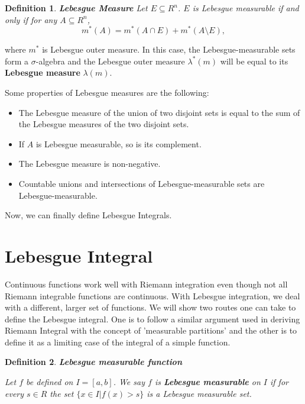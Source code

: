 \documentclass[12pt]{amsart}
\newtheorem{definition}{Definition}
\theoremstyle{plain}
\theoremstyle{definition}
\theoremstyle{remark}
\numberwithin{equation}{section}
\numberwithin{thm}{section}
\begin{document}
\begin{definition} 
\textbf{Lebesgue Measure}
    Let $E \subseteq R^n$. $E$ is Lebesgue measurable if and only if for any $A \subseteq R^n$,
    \begin{equation*}
        m^*(A) = m^*(A \cap E) + m^*(A \setminus E),
    \end{equation*}
\end{definition}
 where $m^*$ is Lebesgue outer measure. In this case, the Lebesgue-measurable sets form a $\sigma$-algebra and the Lebesgue outer measure $\lambda^*(m)$ will be equal to its \textbf{Lebesgue measure} $\lambda(m)$. 

Some properties of Lebesgue measures are the following:

\begin{itemize}
    \item The Lebesgue measure of the union of two disjoint sets is equal to the sum of the Lebesgue measures of the two disjoint sets.
    \item If $A$ is Lebesgue measurable, so is its complement.
    \item The Lebesgue measure is non-negative.
    \item Countable unions and intersections of Lebesgue-measurable sets are Lebesgue-measurable.
\end{itemize}


Now, we can finally define Lebesgue Integrals.

\section{\textbf{Lebesgue Integral}}\label{sec:LebesgueIntegral}
Continuous functions work well with Riemann integration even though not all Riemann integrable functions are continuous. With Lebesgue integration, we deal with a different, larger set of functions. We will show two routes one can take to define the Lebesgue integral. One is to follow a similar argument used in deriving Riemann Integral with the concept of 'measurable partitions' and the other is to define it as a limiting case of the integral of a simple function.  

\begin{definition}
\textbf{Lebesgue measurable function}

Let $f$ be defined on $I=[a,b]$. We say $f$ is \textbf{Lebesgue measurable} on $I$ if for every $s \in R$ the set $\{ x \in I | f(x) > s \}$ is a Lebesgue measurable set. 
\end{definition}
 
\end{document}
